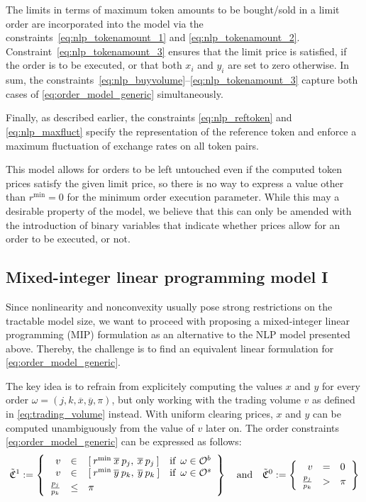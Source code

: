 \documentclass[11pt,parskip=full]{scrartcl}%
\newcommand*{\Min}{\mathrm{min}}
\newcommand*{\buyorders}{\mathcal{O}^b}     %
\newcommand*{\sellorders}{\mathcal{O}^s}    %
\begin{document}
The limits in terms of maximum token amounts to be bought/sold in a limit order are incorporated
into the model via the constraints~\eqref{eq:nlp_tokenamount_1} and \eqref{eq:nlp_tokenamount_2}.
Constraint~\eqref{eq:nlp_tokenamount_3} ensures that the limit price is satisfied, if the order is
to be executed, or that both $ x_i $ and $ y_i $ are set to zero otherwise.
In sum, the constraints~\eqref{eq:nlp_buyvolume}--\eqref{eq:nlp_tokenamount_3} capture both cases
of \eqref{eq:order_model_generic} simultaneously.

Finally, as described earlier, the constraints \eqref{eq:nlp_reftoken} and \eqref{eq:nlp_maxfluct}
specify the representation of the reference token and enforce a maximum fluctuation of exchange
rates on all token pairs.

This model allows for orders to be left untouched even if the computed token prices satisfy the
given limit price, so there is no way to express a value other than $ r^\Min = 0 $ for the
minimum order execution parameter.
While this may a desirable property of the model, we believe that this can only be amended with
the introduction of binary variables that indicate whether prices allow for an order to be
executed, or not.


\newpage
\subsection{Mixed-integer linear programming model I}
\label{subsec:MIP1}

Since nonlinearity and nonconvexity usually pose strong restrictions on the tractable model size,
we want to proceed with proposing a mixed-integer linear programming (MIP) formulation as an
alternative to the NLP model presented above.
Thereby, the challenge is to find an equivalent linear formulation for 
\eqref{eq:order_model_generic}.

The key idea is to refrain from explicitely computing the values $ x $ and $ y $ for every order
$ \omega = (j,k,\overline{x},\overline{y},\pi) $, but only working with the trading volume $ v $ as
defined in \eqref{eq:trading_volume} instead.
With uniform clearing prices, $ x $ and $ y $ can be computed unambiguously from the value of $ v $
later on.
The order constraints \eqref{eq:order_model_generic} can be expressed as follows:
\begin{align}
  \tilde{\mathfrak{C}}^1 := \left\{
  \begin{array}{rlll}
    v &\in & [\>r^\Min \> \overline{x} \> p_j, \>\overline{x} \> p_j \>]
      &\text{if} \enskip \omega \in \buyorders\\
    v &\in & [\>r^\Min \> \overline{y} \> p_k, \>\overline{y} \> p_k \>]
      &\text{if} \enskip \omega \in \sellorders\\[1mm]
    \frac{p_j}{p_k} &\le & \pi
  \end{array}
  \right\}
  \quad
  \text{and}
  \quad
  \tilde{\mathfrak{C}}^0 := \left\{
  \begin{array}{rll}
    v &= & 0 \\[1mm]
    \frac{p_j}{p_k} &> & \pi
  \end{array}
  \right\}
  \label{eq:order_model_mip1}
\end{align}
\end{document}
